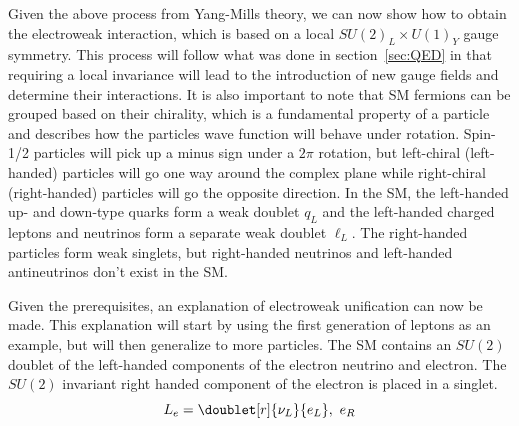 Given the above process from Yang-Mills theory, we can now show how to obtain the electroweak interaction, which is based on a local $SU\left(2\right)_{L}{\times}U\left(1\right)_{Y}$ gauge symmetry. 
This process will follow what was done in section~\ref{sec:QED} in that requiring a local invariance will lead to the introduction of new gauge fields and determine their interactions.
It is also important to note that SM fermions can be grouped based on their chirality, which is a fundamental property of a particle and describes how the particles wave function will behave under rotation.
Spin-1/2 particles will pick up a minus sign under a $2\pi$ rotation, but left-chiral (left-handed) particles will go one way around the complex plane while right-chiral (right-handed) particles will go the opposite direction.
In the SM, the left-handed up- and down-type quarks form a weak doublet $q_{L}$ and the left-handed charged leptons and neutrinos form a separate weak doublet $\ell_{L}$.
The right-handed particles form weak singlets, but right-handed neutrinos and left-handed antineutrinos don't exist in the SM.

Given the prerequisites, an explanation of electroweak unification can now be made.
This explanation will start by using the first generation of leptons as an example, but will then generalize to more particles.
The SM contains an $SU\left(2\right)$ doublet of the left-handed components of the electron neutrino and electron.
The $SU\left(2\right)$ invariant right handed component of the electron is placed in a singlet.
\begin{equation}
	L_{e}=\doublet[r]{\nu_{L}}{e_{L}},\text{ }e_{R}
\end{equation}

